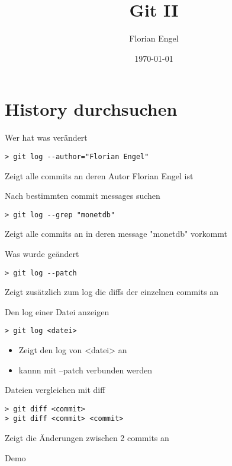 \documentclass[presentation, smaller]{beamer}
\author{Florian Engel}
\date{\today}
\title{Git II}
\begin{document}
\maketitle

\section{History durchsuchen}
\label{sec:orgc740d9b}
\begin{frame}[fragile,label={sec:org15d1ee5}]{Wer hat was verändert}
 \begin{verbatim}
> git log --author="Florian Engel"
\end{verbatim}
Zeigt alle commits an deren Autor Florian Engel ist
\end{frame}
\begin{frame}[fragile,label={sec:org5e7b411}]{Nach bestimmten commit messages suchen}
 \begin{verbatim}
> git log --grep "monetdb"
\end{verbatim}
Zeigt alle commits an in deren message "monetdb" vorkommt
\end{frame}
\begin{frame}[fragile,label={sec:org8bdc85e}]{Was wurde geändert}
 \begin{verbatim}
> git log --patch
\end{verbatim}
Zeigt zusätzlich zum log die diffs der einzelnen commits an
\end{frame}
\begin{frame}[fragile,label={sec:org61ccedc}]{Den log einer Datei anzeigen}
 \begin{verbatim}
> git log <datei>
\end{verbatim}
\begin{itemize}
\item Zeigt den log von <datei> an
\item kannn mit --patch verbunden werden
\end{itemize}
\end{frame}
\begin{frame}[fragile,label={sec:orgbc19348}]{Dateien vergleichen mit diff}
 \begin{verbatim}
> git diff <commit>
> git diff <commit> <commit>
\end{verbatim}
Zeigt die Änderungen zwischen 2 commits an
\end{frame}
\begin{frame}[label={sec:orgbf3491e}]{}
\begin{center}
Demo
\end{center}
\end{frame}
\end{document}
